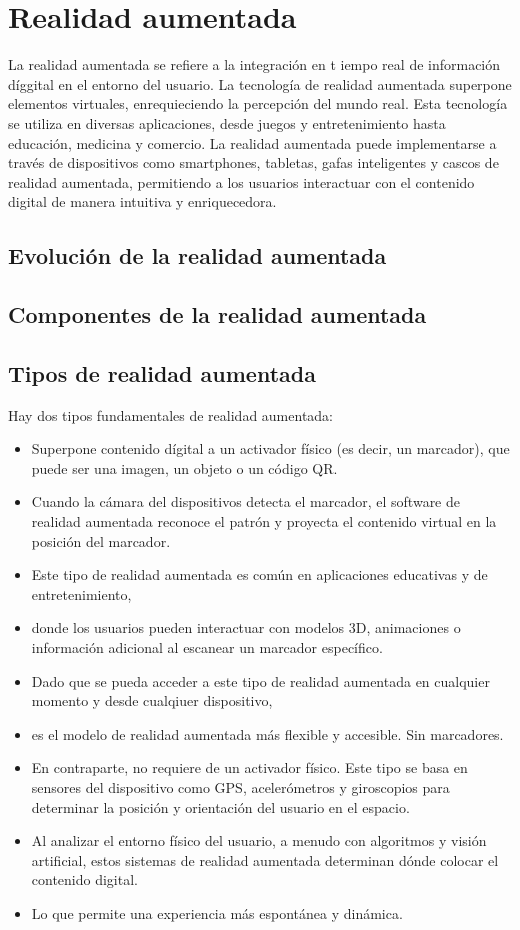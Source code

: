 \section{Realidad aumentada}
La realidad aumentada se refiere a la integración en t iempo real de información díggital
en el entorno del usuario. La tecnología de realidad aumentada superpone elementos virtuales,
enrequieciendo la percepción del mundo real. Esta tecnología se utiliza en diversas aplicaciones,
desde juegos y entretenimiento hasta educación, medicina y comercio. 
La realidad aumentada puede implementarse a través de dispositivos como smartphones, tabletas, gafas inteligentes y cascos de realidad aumentada, 
permitiendo a los usuarios interactuar con el contenido digital de manera intuitiva y enriquecedora.
\subsection {Evolución de la realidad aumentada} 
\subsection {Componentes de la realidad aumentada}
\subsection{Tipos de realidad aumentada}
Hay dos tipos fundamentales de realidad aumentada:
\begin{itemize}
    Por marcadores.
    \item Superpone contenido dígital a un activador físico (es decir, un marcador), que puede ser una imagen, un objeto o un código QR.
    \item Cuando la cámara del dispositivos detecta el marcador, el software de realidad aumentada reconoce el patrón y proyecta el contenido virtual en la posición del marcador.
    \item Este tipo de realidad aumentada es común en aplicaciones educativas y de entretenimiento, 
    \item donde los usuarios pueden interactuar con modelos 3D, animaciones o información adicional al escanear un marcador específico.
    \item Dado que se pueda acceder a este tipo de realidad aumentada en cualquier momento y desde cualqiuer dispositivo,
    \item es el modelo de realidad aumentada más flexible y accesible.
    Sin marcadores.
    \item En contraparte, no requiere de un activador físico. Este tipo se basa en sensores del dispositivo como GPS, acelerómetros y giroscopios para determinar la posición y orientación del usuario en el espacio.
    \item Al analizar el entorno físico del usuario, a menudo con algoritmos y visión artificial, estos sistemas de realidad aumentada determinan dónde colocar el contenido digital.
    \item Lo que permite una experiencia más espontánea y dinámica.
\end{itemize}